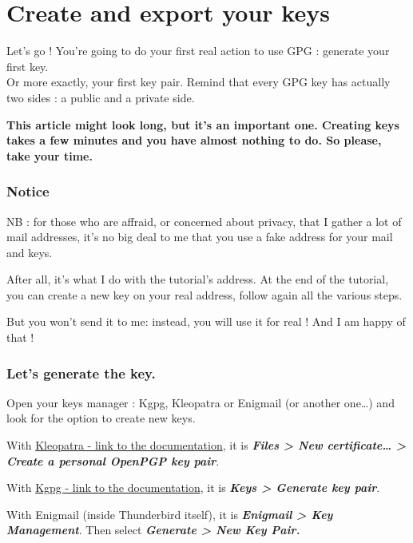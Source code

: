 \chapter{Create and export your keys}

Let's go ! You're going to do your first real action to use GPG :
generate your first key.\\Or more exactly, your first key pair. Remind
that every GPG key has actually two sides : a public and a private side.

\textbf{This article might look long, but it's an important one.
Creating keys takes a few minutes and you have almost nothing to do. So
please, take your time.}

\subsection{Notice}\label{notice}

NB : for those who are affraid, or concerned about privacy, that I
gather a lot of mail addresses, it's no big deal to me that you use a
fake address for your mail and keys.

After all, it's what I do with the tutorial's address. At the end of the
tutorial, you can create a new key on your real address, follow again
all the various steps.

But you won't send it to me: instead, you will use it for real ! And I
am happy of that !

\subsection{Let's generate the key.}\label{lets-generate-the-key.}

Open your keys manager : Kgpg, Kleopatra or Enigmail (or another
one\ldots{}) and look for the option to create new keys.

With
\href{https://docs.kde.org/stable/en/kdepim/kleopatra/index.html}{Kleopatra
- link to the documentation}, it is \textbf{\emph{Files \textgreater{}
New certificate\ldots{} \textgreater{} Create a personal OpenPGP key
pair}}.

With \href{https://docs.kde.org/stable/en/kdeutils/kgpg/}{Kgpg - link to
the documentation}, it is \textbf{\emph{Keys \textgreater{} Generate key
pair}}.

With Enigmail (inside Thunderbird itself), it is \textbf{\emph{Enigmail
\textgreater{} Key Management}}. Then select \textbf{\emph{Generate
\textgreater{} New Key Pair.}}

